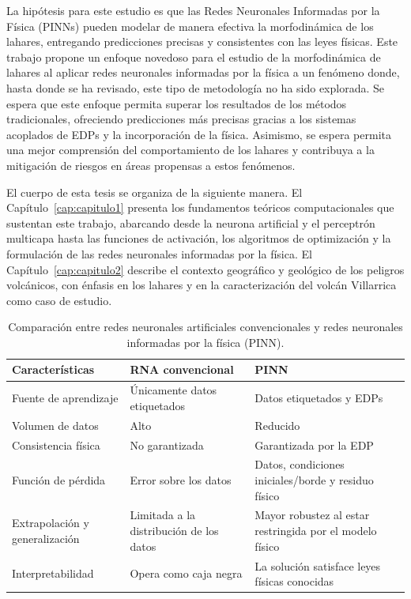 La hipótesis para este estudio es que las Redes Neuronales Informadas por la Física (PINNs) pueden modelar de manera efectiva la morfodinámica de los lahares, entregando predicciones precisas y consistentes con las leyes físicas. 
Este trabajo propone un enfoque novedoso para el estudio de la morfodinámica de lahares al aplicar redes neuronales informadas por la física a un fenómeno donde, hasta donde se ha revisado, este tipo de metodología no ha sido explorada.
Se espera que este enfoque permita superar los resultados de los métodos tradicionales, ofreciendo predicciones más precisas gracias a los sistemas acoplados de EDPs y la incorporación de la física.
Asimismo, se espera permita una mejor comprensión del comportamiento de los lahares y contribuya a la mitigación de riesgos en áreas propensas a estos fenómenos. 

El cuerpo de esta tesis se organiza de la siguiente manera. El Capítulo~\ref{cap:capitulo1} presenta los fundamentos teóricos computacionales que sustentan este trabajo, abarcando desde la neurona artificial y el perceptrón multicapa hasta las funciones de activación, los algoritmos de optimización y la formulación de las redes neuronales informadas por la física. 
El Capítulo~\ref{cap:capitulo2} describe el contexto geográfico y geológico de los peligros volcánicos, con énfasis en los lahares y en la caracterización del volcán Villarrica como caso de estudio. %

\begin{table}[htbp]
    \centering
    \caption{Comparación entre redes neuronales artificiales convencionales y redes neuronales informadas por la física (PINN).}
    \label{tab:ann_vs_pinn}
    \begin{tabular}{>{\raggedright\arraybackslash}p{} 
                    >{\raggedright\arraybackslash}p{} 
                    >{\raggedright\arraybackslash}p{}}
        \toprule
        \textbf{Características} & \textbf{RNA convencional} & \textbf{PINN} \\
        \midrule
        Fuente de aprendizaje & Únicamente datos etiquetados & Datos etiquetados y EDPs \\[0.5em]
        Volumen de datos & Alto & Reducido \\[0.5em]
        Consistencia física & No garantizada & Garantizada por la EDP \\[0.5em]
        Función de pérdida & Error sobre los datos & Datos, condiciones iniciales/borde y residuo físico \\[0.5em]
        Extrapolación y generalización & Limitada a la distribución de los datos & Mayor robustez al estar restringida por el modelo físico \\[0.5em]
        Interpretabilidad & Opera como caja negra & La solución satisface leyes físicas conocidas \\
        \bottomrule
    \end{tabular}
\end{table}
